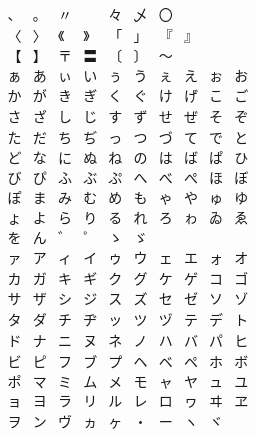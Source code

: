 \documentclass{standalone}
\begin{document}
$\displaystyle
  \begin{array}{cccccccccc}
    、&。&〃&　&々&乄&〇&　&　&　\\
    〈&〉&《&》&「&」&『&』&　&　\\
    【&】&〒&〓&〔&〕&〜&　&　&　\\
    ぁ&あ&ぃ&い&ぅ&う&ぇ&え&ぉ&お\\
    か&が&き&ぎ&く&ぐ&け&げ&こ&ご\\
    さ&ざ&し&じ&す&ず&せ&ぜ&そ&ぞ\\
    た&だ&ち&ぢ&っ&つ&づ&て&で&と\\
    ど&な&に&ぬ&ね&の&は&ば&ぱ&ひ\\
    び&ぴ&ふ&ぶ&ぷ&へ&べ&ぺ&ほ&ぼ\\
    ぽ&ま&み&む&め&も&ゃ&や&ゅ&ゆ\\
    ょ&よ&ら&り&る&れ&ろ&ゎ&ゐ&ゑ\\
    を&ん&゛&゜&ゝ&ゞ&　&　&　&　\\
    ァ&ア&ィ&イ&ゥ&ウ&ェ&エ&ォ&オ\\
    カ&ガ&キ&ギ&ク&グ&ケ&ゲ&コ&ゴ\\
    サ&ザ&シ&ジ&ス&ズ&セ&ゼ&ソ&ゾ\\
    タ&ダ&チ&ヂ&ッ&ツ&ヅ&テ&デ&ト\\
    ド&ナ&ニ&ヌ&ネ&ノ&ハ&バ&パ&ヒ\\
    ビ&ピ&フ&ブ&プ&ヘ&ベ&ペ&ホ&ボ\\
    ポ&マ&ミ&ム&メ&モ&ャ&ヤ&ュ&ユ\\
    ョ&ヨ&ラ&リ&ル&レ&ロ&ヮ&ヰ&ヱ\\
    ヲ&ン&ヴ&ヵ&ヶ&・&ー&ヽ&ヾ&　
  \end{array}
$
\end{document}

